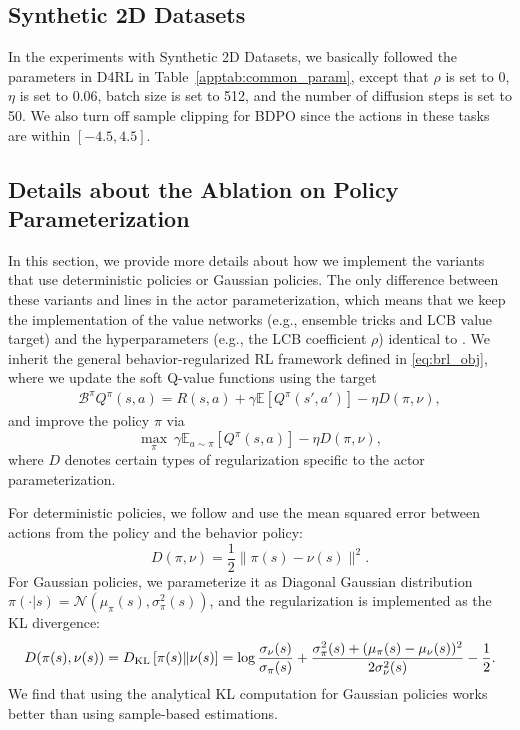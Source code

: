 \subsection{Synthetic 2D Datasets}

In the experiments with Synthetic 2D Datasets, we basically followed the parameters in D4RL in Table~\ref{apptab:common_param}, except that $\rho$ is set to 0, $\eta$ is set to 0.06, batch size is set to 512, and the number of diffusion steps is set to 50. We also turn off sample clipping for BDPO since the actions in these tasks are within $[-4.5, 4.5]$.

\subsection{Details about the Ablation on Policy Parameterization}\label{appsec:abla_arch_detail}
In this section, we provide more details about how we implement the variants that use deterministic policies or Gaussian policies. The only difference between these variants and \algbb lines in the actor parameterization, which means that we keep the implementation of the value networks (e.g., ensemble tricks and LCB value target) and the hyperparameters (e.g., the LCB coefficient $\rho$) identical to \algbb. We inherit the general behavior-regularized RL framework defined in \eqref{eq:brl_obj}, where we update the soft Q-value functions using the target
\begin{equation}
    \begin{aligned}
        \mathcal{B}^\pi Q^\pi(s, a)=R(s, a)+\gamma \mathbb{E}\left[Q^\pi(s', a')\right]-\eta D(\pi, \nu),
    \end{aligned}
\end{equation}
and improve the policy $\pi$ via
\begin{equation}
    \max_\pi\ \gamma \mathbb{E}_{a\sim\pi}\left[Q^\pi(s, a)\right]-\eta D(\pi, \nu),
\end{equation}
where $D$ denotes certain types of regularization specific to the actor parameterization.

For deterministic policies, we follow \citet{rebrac} and use the mean squared error between actions from the policy and the behavior policy:
\begin{equation}
    D(\pi,\nu) = \frac 12\|\pi(s)-\nu(s)\|^2. 
\end{equation}
For Gaussian policies, we parameterize it as Diagonal Gaussian distribution $\pi(\cdot|s)=\mathcal{N}(\mu_{\pi}(s), \sigma_{\pi}^2(s))$, and the regularization is implemented as the KL divergence:
\begin{equation}
    \begin{aligned}
        D(\pi(s),\nu(s))=D_{\rm KL}\left[\pi(s)\|\nu(s)\right]=\log \frac{\sigma_\nu(s)}{\sigma_{\pi}(s)} + \frac{\sigma_\pi^2(s)+(\mu_\pi(s)-\mu_\nu(s))^2}{2\sigma_\nu^2(s)}-\frac 12. 
    \end{aligned}
\end{equation}
We find that using the analytical KL computation for Gaussian policies works better than using sample-based estimations.

